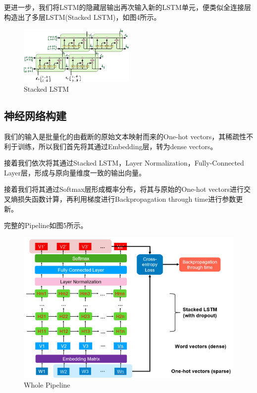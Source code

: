 \documentclass[12pt,a4paper]{article}
\begin{document}
    更进一步，我们将LSTM的隐藏层输出再次输入新的LSTM单元，便类似全连接层构造出了多层LSTM(Stacked LSTM)，如图4所示。

    \begin{figure}[!h]
        \centering
        \includegraphics[width=0.5\textwidth]{图片1.png}
        \caption{Stacked LSTM}
    \end{figure}


\subsection{神经网络构建}
    我们的输入是批量化的由截断的原始文本映射而来的One-hot vectors，其稀疏性不利于训练，所以我们首先将其通过Embedding层，转为dense vectors。
    
    接着我们依次将其通过Stacked LSTM，Layer Normalization，Fully-Connected Layer层，形成与原向量维度一致的输出向量。
    
    接着我们将其通过Softmax层形成概率分布，将其与原始的One-hot vectors进行交叉熵损失函数计算，再利用梯度进行Backpropagation through time进行参数更新。
    
    完整的Pipeline如图5所示。
\begin{figure}[!h]
    \centering
    \includegraphics[width=1\textwidth]{图片3.png}
    \caption{Whole Pipeline}
\end{figure}
\end{document}
